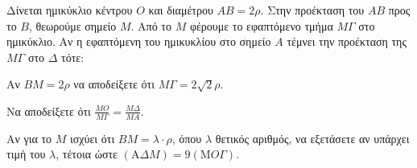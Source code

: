 \begin{figure}
\end{figure}
Δίνεται ημικύκλιο κέντρου $O$ και διαμέτρου $AB = 2\rho$. Στην προέκταση του $AB$ προς το $B$, θεωρούμε σημείο $M$. Από το $M$ φέρουμε το εφαπτόμενο τμήμα $M\Gamma$ στο ημικύκλιο. Αν η εφαπτόμενη του ημικυκλίου στο σημείο $A$ τέμνει την προέκταση της $M\Gamma$ στο $\Delta$ τότε:
\begin{alist}
    \item Αν $BM = 2\rho$ να αποδείξετε ότι $M\Gamma = 2\sqrt{2}\rho$. 
    \item \begin{rlist}
        \item Να αποδείξετε ότι $\frac{MO}{M\Gamma} = \frac{M\Delta}{MA}$. 
        \item Αν για το $M$ ισχύει ότι $BM = \lambda \cdot \rho$, όπου $\lambda$ θετικός αριθμός, να εξετάσετε αν υπάρχει τιμή του $\lambda$, τέτοια ώστε $(\mathrm{A}\Delta M) = 9(\mathrm{M}O\Gamma)$. 
    \end{rlist}
\end{alist}